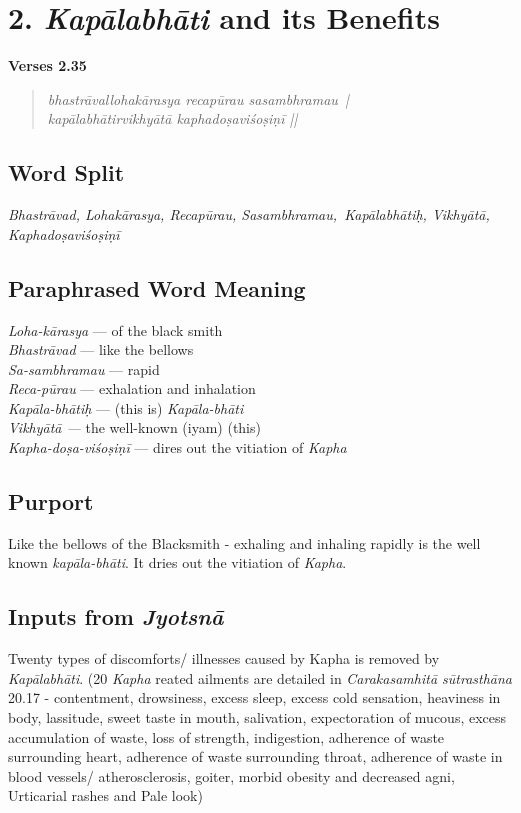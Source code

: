 \section*{2. \textit{Kapālabhāti} and its Benefits}

\noindent \textbf{Verses 2.35}

\begin{verse}
\textit{bhastrāvallohakārasya recapūrau sasambhramau |\\
kapālabhātirvikhyātā kaphadoṣaviśoṣiṇī ||}
\end{verse}

\subsection*{Word Split}


\textit{Bhastrāvad, Lohakārasya, Recapūrau, Sasambhramau, Kapālabhātiḥ, Vikhyātā, Kaphadoṣaviśoṣiṇī}

\subsection*{Paraphrased Word Meaning}


\begin{multicols}{2}
\textit{Loha-kārasya} --- of the black smith \\
\textit{Bhastrāvad} --- like the bellows \\
\textit{Sa-sambhramau} --- rapid\\
\textit{Reca-pūrau} --- exhalation and inhalation \\
\textit{Kapāla-bhātiḥ} --- (this is) \textit{Kapāla-bhāti}\\
\textit{Vikhyātā ---} the well-known (iyam) (this)\\
\textit{Kapha-doṣa-viśoṣiṇī} --- dires out the vitiation of \textit{Kapha} 
\end{multicols}

\subsection*{Purport}


Like the bellows of the Blacksmith - exhaling and inhaling rapidly is the well known \textit{kapāla-bhāti}. It dries out the vitiation of \textit{Kapha}.

\subsection*{Inputs from \textit{Jyotsnā}}


Twenty types of discomforts/ illnesses caused by Kapha is removed by \textit{Kapālabhāti}. (20 \textit{Kapha} reated ailments are detailed in  \textit{Carakasamhitā sūtrasthāna} 20.17  -  contentment, drowsiness, excess sleep, excess cold sensation, heaviness in body, lassitude, sweet taste in mouth, salivation, expectoration of mucous, excess accumulation of waste, loss of strength, indigestion, adherence of waste surrounding heart, adherence of waste surrounding throat, adherence of waste in blood vessels/ atherosclerosis, goiter, morbid obesity and decreased agni, Urticarial rashes and Pale look)
